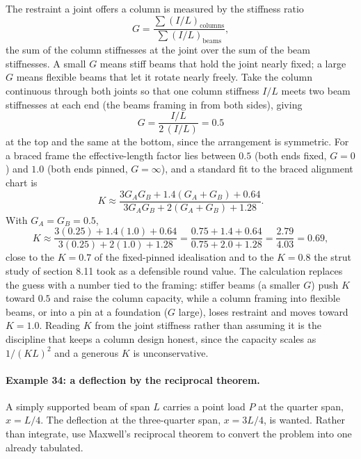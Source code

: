 The restraint a joint offers a column is measured by the stiffness ratio
\[
G = \frac{\sum (I/L)_{\text{columns}}}{\sum (I/L)_{\text{beams}}},
\]
the sum of the column stiffnesses at the joint over the sum of the beam
stiffnesses. A small $G$ means stiff beams that hold the joint nearly
fixed; a large $G$ means flexible beams that let it rotate nearly freely.
Take the column continuous through both joints so that one column stiffness
$I/L$ meets two beam stiffnesses at each end (the beams framing in from
both sides), giving
\[
G = \frac{I/L}{2\,(I/L)} = 0.5
\]
at the top and the same at the bottom, since the arrangement is symmetric.
For a braced frame the effective-length factor lies between $0.5$ (both
ends fixed, $G = 0$) and $1.0$ (both ends pinned, $G = \infty$), and a
standard fit to the braced alignment chart is
\[
K \approx \frac{3 G_A G_B + 1.4(G_A + G_B) + 0.64}
{3 G_A G_B + 2(G_A + G_B) + 1.28}.
\]
With $G_A = G_B = 0.5$,
\[
K \approx \frac{3(0.25) + 1.4(1.0) + 0.64}{3(0.25) + 2(1.0) + 1.28}
= \frac{0.75 + 1.4 + 0.64}{0.75 + 2.0 + 1.28}
= \frac{2.79}{4.03} = 0.69,
\]
close to the $K = 0.7$ of the fixed-pinned idealisation and to the $K =
0.8$ the strut study of section 8.11 took as a defensible round value. The
calculation replaces the guess with a number tied to the framing: stiffer
beams (a smaller $G$) push $K$ toward $0.5$ and raise the column capacity,
while a column framing into flexible beams, or into a pin at a foundation
($G$ large), loses restraint and moves toward $K = 1.0$. Reading $K$ from
the joint stiffness rather than assuming it is the discipline that keeps a
column design honest, since the capacity scales as $1/(KL)^2$ and a
generous $K$ is unconservative.

\paragraph{Example 34: a deflection by the reciprocal theorem.} A simply
supported beam of span $L$ carries a point load $P$ at the quarter span,
$x = L/4$. The deflection at the three-quarter span, $x = 3L/4$, is wanted.
Rather than integrate, use Maxwell's reciprocal theorem to convert the
problem into one already tabulated.

